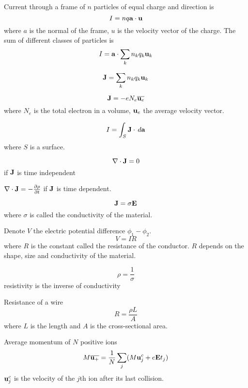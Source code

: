 \documentclass[a4paper]{article}
\begin{document}
\begin{defn} Current through a frame of $n$ particles of equal charge and direction  is $$I=nq\vb{a}\cdot\vb{u}$$ where $a$ is the normal of the frame, $u$ is the velocity vector of the charge. The sum of different classes of particles is $$I=\vb{a}\cdot\sum_{k}n_kq_k\vb{u}_k$$
\end{defn}

\begin{defn} $$\vb{J}=\sum_kn_kq_k\vb{u}_k$$
\end{defn}

\begin{prp} $$\vb{J}=-eN_e\overline{\vb{u}_e}$$ where $N_e$ is the total electron in a volume, $\vb{u}_e$ the average velocity vector. 
\end{prp}

\begin{thm} $$I=\int_S\vb{J}\cdot\,d\vb{a}$$ where $S$ is a surface. 
\end{thm}

\begin{thm} $$\nabla\cdot\vb{J}=0$$ if $\vb{J}$ is time independent
\end{thm}

\begin{thm} $\nabla\cdot\vb{J}=-\frac{\partial\rho}{\partial t}$ if $\vb{J}$ is time dependent. 
\end{thm}

\begin{thm} $$\vb{J}=\sigma\vb{E}$$ where $\sigma$ is called the conductivity of the material. 
\end{thm}

\begin{thm} Denote $V$ the electric potential difference $\phi_1-\phi_2$. $$V=IR$$ where $R$ is the constant called the resistance of the conductor. $R$ depends on the shape, size and conductivity of the material. 
\end{thm}

\begin{defn} $$\rho=\frac{1}{\sigma}$$ resistivity is the inverse of conductivity
\end{defn}

\begin{thm} Resistance of a wire $$R=\frac{\rho L}{A}$$ where $L$ is the length and $A$ is the cross-sectional area. 
\end{thm}

\begin{thm} Average momentum of $N$ positive ions $$M\overline{\vb{u}_+}=\frac{1}{N}\sum_j(M\vb{u}_j^c+e\vb{E}t_j)$$ $\vb{u}_j^c$ is the velocity of the $j$th ion after its last collision. 
\end{thm}
\end{document}
